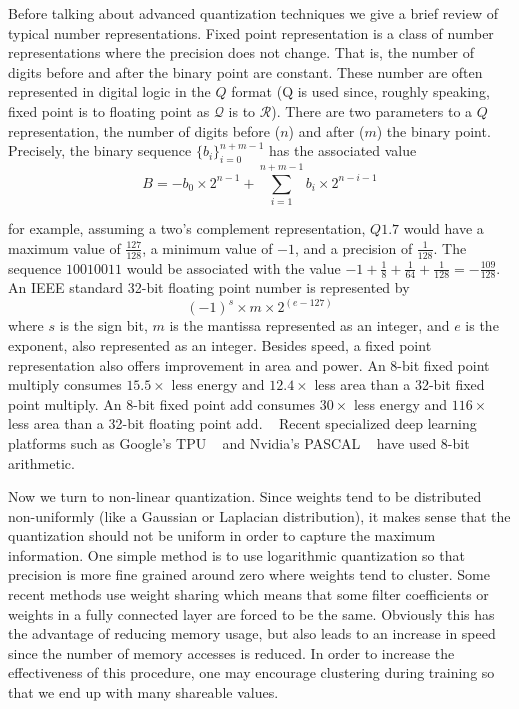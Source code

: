 Before talking about advanced quantization techniques we give a brief review of typical number representations.  Fixed point representation is a class of number representations where the precision does not change.  That is, the number of digits before and after the binary point are constant.  These number are often represented in digital logic in the $Q$ format (Q is used since, roughly speaking, fixed point is to floating point as $\mathcal{Q}$ is to $\mathcal{R}$).  There are two parameters to a $Q$ representation, the number of digits before ($n$) and after ($m$) the binary point.  Precisely, the binary sequence $\{b_i\}_{i=0}^{n+m-1}$ has the associated value
$$ B = - b_0\times 2^{n-1} + \sum_{i=1}^{n+m-1} b_i \times 2^{n-i-1}$$

for example, assuming a two's complement representation, $Q1.7$ would have a maximum value of $\frac{127}{128}$, a minimum value of $-1$, and a precision of $\frac{1}{128}$.  The sequence $10010011$ would be associated with the value $-1 + \frac{1}{8} + \frac{1}{64} + \frac{1}{128} = -\frac{109}{128}$. 
An IEEE standard 32-bit floating point number is represented by 
$$ (-1)^s \times m \times 2^{(e-127)}$$
where $s$ is the sign bit, $m$ is the mantissa represented as an integer, and $e$ is the exponent, also represented as an integer.  Besides speed, a fixed point representation also offers improvement in area and power.  An 8-bit fixed point multiply consumes $15.5 \times$ less energy and $12.4\times$ less area than a 32-bit fixed point multiply.  An 8-bit fixed point add consumes $30\times$ less energy and $116\times$ less area than a 32-bit floating point add. ~\cite{Horowitz}  Recent specialized deep learning platforms such as Google's TPU ~\cite{DBLP:journals/corr/JouppiYPPABBBBB17} and Nvidia's PASCAL ~\cite{PASCAL} have used 8-bit arithmetic.

Now we turn to non-linear quantization.  Since weights tend to be distributed non-uniformly (like a Gaussian or Laplacian distribution), it makes sense that the quantization should not be uniform in order to capture the maximum information.  One simple method is to use logarithmic quantization so that precision is more fine grained around zero where weights tend to cluster.  Some recent methods use weight sharing which means that some filter coefficients or weights in a fully connected layer are forced to be the same.  Obviously this has the advantage of reducing memory usage, but also leads to an increase in speed since the number of memory accesses is reduced.  In order to increase the effectiveness of this procedure, one may encourage clustering during training so that we end up with many shareable values. ~\cite{DBLP:journals/corr/HanMD15}

